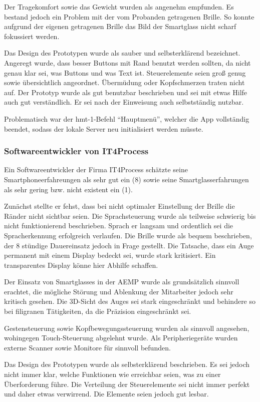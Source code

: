 Der Tragekomfort sowie das Gewicht wurden als angenehm empfunden. Es bestand jedoch ein Problem mit der vom Probanden getragenen Brille. So konnte aufgrund der eigenen getragenen Brille das Bild der Smartglass nicht scharf fokussiert werden.

Das Design des Prototypen wurde als sauber und selbsterklärend bezeichnet. Angeregt wurde, dass besser Buttons mit Rand benutzt werden sollten, da nicht genau klar sei, was Buttons und was Text ist. Steuerelemente seien groß genug sowie übersichtlich angeordnet. Übermüdung oder Kopfschmerzen traten nicht auf. Der Prototyp wurde als gut benutzbar beschrieben und sei mit etwas Hilfe auch gut verständlich. Er sei nach der Einweisung auch selbstständig nutzbar.

Problematisch war der hmt-1-Befehl \enquote{Hauptmenü}, welcher die App vollständig beendet, sodass der lokale Server neu initialisiert werden müsste.
%
%
\subsubsection{Softwareentwickler von IT4Process}
Ein Softwareentwickler der Firma IT4Process schätzte seine Smartphoneerfahreungen als sehr gut ein (8) sowie seine Smartglasserfahrungen als sehr gering bzw. nicht existent ein (1).

Zunächst stellte er fehst, dass bei nicht optimaler Einstellung der Brille die Ränder nicht sichtbar seien. Die Sprachsteuerung wurde als teilweise schwierig bis nicht funktionierend beschrieben. Sprach er langsam und ordentlich sei die Spracherkennung erfolgreich verlaufen. Die Brille wurde als bequem beschrieben, der 8 stündige Dauereinsatz jedoch in Frage gestellt. Die Tatsache, dass ein Auge permanent mit einem Display bedeckt sei, wurde stark kritisiert. Ein transparentes Display könne hier Abhilfe schaffen.

Der Einsatz von Smartglasses in der AEMP wurde als grundsätzlich sinnvoll erachtet, die mögliche Störung und Ablenkung der Mitarbeiter jedoch sehr kritisch gesehen. Die 3D-Sicht des Auges sei stark eingeschränkt und behindere so bei filigranen Tätigkeiten, da die Präzision eingeschränkt sei.

Gestensteuerung sowie Kopfbewegungssteuerung wurden als sinnvoll angesehen, wohingegen Touch-Steuerung abgelehnt wurde. Als Peripheriegeräte wurden externe Scanner sowie Monitore für sinnvoll befunden.

Das Design des Prototypen wurde als selbsterklärend beschrieben. Es sei jedoch nicht immer klar, welche Funktionen wie erreichbar seien, was zu einer Überforderung führe. Die Verteilung der Steuerelemente sei nicht immer perfekt und daher etwas verwirrend. Die Elemente seien jedoch gut lesbar.

